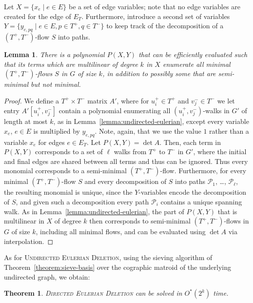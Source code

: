 \documentclass[10pt,a4paper]{article}
\newtheorem{theorem}{Theorem}[section]
\newtheorem{lemma}{Lemma}[section]
\newcommand{\cP}{\ensuremath{\mathcal P}\xspace}
\begin{document}
Let $X=\{x_e \mid e \in E\}$ be a set of edge variables; note that no edge variables are created
for the edge of $E_T$. Furthermore, introduce a second set of variables
$Y=\{y_{e,pq} \mid e \in E, p \in T^+, q \in T^-\}$ to keep track of the decomposition of a $(T^+,T^-)$-flow $S$ into paths.


\begin{lemma}
  \label{lemma:directed-eulerian}
  There is a polynomial $P(X,Y)$ that can be efficiently evaluated such that its terms which are
  multilinear of degree $k$ in $X$ enumerate all minimal $(T^+,T^-)$-flows $S$ in $G$ of size $k$,
  in addition to possibly some that are semi-minimal but not minimal.
\end{lemma}
\begin{proof}
  We define a $T^+ \times T^-$ matrix $A'$, where for $u_i^+ \in T^+$ and $v_j^- \in T^-$
  we let entry $A'[u_i^+, v_j^-]$ contain a polynomial enumerating all $(u_i^+,v_j^-)$-walks in $G'$ of length at most $k$, as in Lemma~\ref{lemma:undirected-eulerian}, except every variable $x_e$, $e \in E$ is multiplied by $y_{e,pq}$. Note, again, that we use the value $1$ rather than a variable $x_e$ for edges $e \in E_T$. 
  Let $P(X,Y) = \det A$.
  Then, each term in $P(X,Y)$ corresponds to a set of $\ell$ walks from $T^+$ to $T^-$ in $G'$, where the initial and final edges are shared 
  between all terms and thus can be ignored. Thus every monomial corresponds to a semi-minimal $(T^+,T^-)$-flow.
  Furthermore, for every minimal $(T^+,T^-)$-flow $S$ and every decomposition of $S$ into paths $\cP_1$, \ldots, $\cP_\ell$, 
  the resulting monomial is unique, since the $Y$-variables encode the decomposition of $S$, and given such a decomposition every path $\cP_i$ contains a unique spanning walk. 
  As in Lemma~\ref{lemma:undirected-eulerian}, the part of $P(X,Y)$ that is multilinear in $X$ of degree $k$
  then corresponds to semi-minimal $(T^+,T^-)$-flows in $G$ of size $k$, including all minimal flows, and can be evaluated using $\det A$ via interpolation. 
\end{proof}

As for \textsc{Undirected Eulerian Deletion}, using the sieving algorithm of Theorem~\ref{theorem:sieve-basis} over the cographic matroid of the underlying undirected graph, we obtain:

\begin{theorem}
  \textsc{Directed Eulerian Deletion} can be solved in $O^*(2^k)$ time.
\end{theorem}
\end{document}
